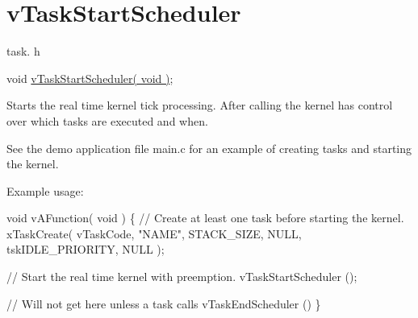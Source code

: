 \hypertarget{group__v_task_start_scheduler}{}\section{v\+Task\+Start\+Scheduler}
\label{group__v_task_start_scheduler}
task. h 
\begin{DoxyPre}void \hyperlink{task_8h_aaf9dca1065c60abdeb309d56ab7293cb}{vTaskStartScheduler( void )};\end{DoxyPre}


Starts the real time kernel tick processing. After calling the kernel has control over which tasks are executed and when.

See the demo application file main.\+c for an example of creating tasks and starting the kernel.

Example usage\+: 
\begin{DoxyPre}
void vAFunction( void )
\{
    // Create at least one task before starting the kernel.
    xTaskCreate( vTaskCode, "NAME", STACK\_SIZE, NULL, tskIDLE\_PRIORITY, NULL );\end{DoxyPre}



\begin{DoxyPre}    // Start the real time kernel with preemption.
    vTaskStartScheduler ();\end{DoxyPre}



\begin{DoxyPre}    // Will not get here unless a task calls vTaskEndScheduler ()
\}
  \end{DoxyPre}
 